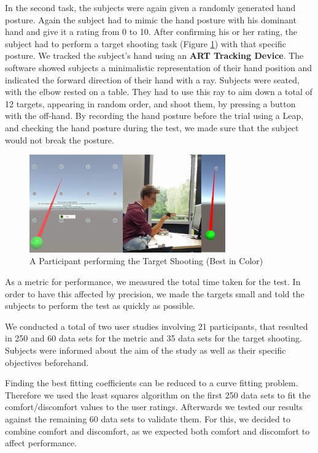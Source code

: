 \documentclass[headsepline,footsepline,footinclude=false,oneside,fontsize=11pt,paper=a4,listof=totoc,bibliography=totoc]{scrbook} %
\begin{document}
In the second task, the subjects were again given a randomly generated hand posture. Again the subject had to mimic the hand posture with his dominant hand and give it a rating from 0 to 10. After confirming his or her rating, the subject had to perform a target shooting task (Figure \ref{fig:participant}) with that specific posture. We tracked the subject's hand using an \textbf{ART Tracking Device}. The software showed subjects a minimalistic representation of their hand position and indicated the forward direction of their hand with a ray. Subjects were seated, with the elbow rested on a table. They had to use this ray to aim down a total of 12 targets, appearing in random order, and shoot them, by pressing a button with the off-hand. By recording the hand posture before the trial using a Leap, and checking the hand posture during the test, we made sure that the subject would not break the posture. 

\begin{figure}[h]
\centering
\includegraphics[width=8.45cm]{Participant}
\vspace{-20pt}
\caption{A Participant performing the Target Shooting (Best in Color)}
\label{fig:participant}
\vspace{-10pt}
\end{figure}

As a metric for performance, we measured the total time taken for the test. In order to have this affected by precision, we made the targets small and told the subjects to perform the test as quickly as possible.

We conducted a total of two user studies involving 21 participants, that resulted in 250 and 60 data sets for the metric and 35 data sets for the target shooting. Subjects were informed about the aim of the study as well as their specific objectives beforehand.

Finding the best fitting coefficients can be reduced to a curve fitting problem. Therefore we used the least squares algorithm on the first 250 data sets to fit the comfort/discomfort values to the user ratings. Afterwards we tested our results against the remaining 60 data sets to validate them. For this, we decided to combine comfort and discomfort, as we expected both comfort and discomfort to affect performance.
\end{document}

